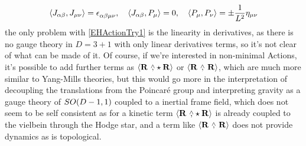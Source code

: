 \begin{align*}
    \expval{J_{\alpha\beta},J_{\mu\nu}}=\tensor{\epsilon}{_\alpha_\beta_\mu_\nu},\ \ \ \expval{J_{\alpha\beta},P_\mu}=0,\ \ \ \expval{P_\mu,P_\nu}=\pm\frac{1}{L^2}\eta_{\mu\nu}
\end{align*}
the only problem with \ref{EHActionTry1} is the linearity in derivatives, as there is no gauge theory in $D=3+1$ with only linear derivatives terms, so it's not clear of what can be made of it. Of course, if we're interested in non-minimal 
Actions, it's possible to add further terms as $\expval{\vb R\ \wedgecomma\star\vb R}$ or $\expval{\vb R\ \wedgecomma\ \vb R}$, which are much more similar to Yang-Mills theories, but this would go more in the interpretation of 
decoupling the translations from the Poincaré group and interpreting gravity as a gauge theory of $SO\qty(D-1,1)$ coupled to a inertial frame field, which does not seem to be self consistent as for a kinetic term $\expval{\vb R\ \wedgecomma\star\vb R}$ 
is already coupled to the vielbein through the Hodge star, and a term like $\expval{\vb R\ \wedgecomma\ \vb R}$ does not provide dynamics as is topological.